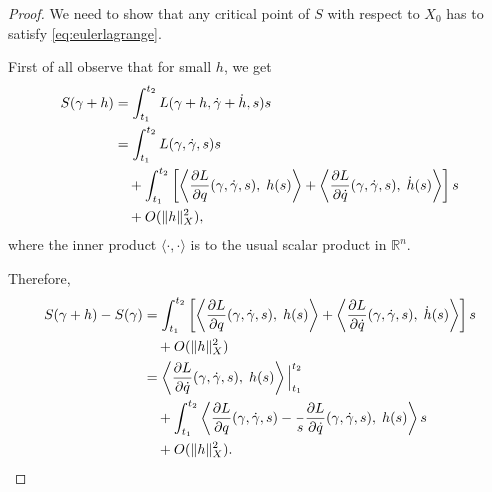 \documentclass[english,fontsize=11pt,paper=a5,oneside]{scrbook}
\newcommand{\R}{\mathbb{R}}
\newcommand{\lag}{\langle}
\newcommand{\rag}{\rangle}
\let\d\relax
\DeclareMathOperator{\d}{d}
\theoremstyle{definition}
\begin{document}
\begin{proof}
    We need to show that any critical point of $S$ with respect to $X_0$ has to satisfy \eqref{eq:eulerlagrange}.

    First of all observe that for small $h$, we get
    \begin{equation}
        \begin{split}
            S(\gamma + h) &= \int_{t_1}^{t_2} L(\gamma + h, \dot \gamma + \dot h, s) \d s \\
            &= \int_{t_1}^{t_2} %
                L(\gamma, \dot \gamma, s) \d s \\
            &\quad + \int_{t_1}^{t_2} \left[
                \left\lag
                    \frac{\partial L}{\partial q}(\gamma, \dot \gamma, s),\;
                    h(s)
                \right\rag
                + \left\lag
                    \frac{\partial L}{\partial \dot q}(\gamma, \dot \gamma, s),\;
                    \dot h(s)
                \right\rag
            \right] \d s \\
            &\quad + O(\|h\|^2_X),
        \end{split}
    \end{equation}
    where the inner product $\lag\cdot,\cdot\rag$ is to the usual scalar product in $\R^n$.

    Therefore,
    \begin{equation}
        \begin{split}
            S(\gamma+h) - S(\gamma) &= \int_{t_1}^{t_2} \left[
                \left\lag\frac{\partial L}{\partial q}(\gamma, \dot \gamma, s),\; h(s)\right\rag
                + \left\lag\frac{\partial L}{\partial \dot q}(\gamma, \dot \gamma, s),\; \dot h(s)\right\rag
            \right] \d s\\
            &\quad + O(\|h\|^2_X)\\
            &= \left\lag\frac{\partial L}{\partial \dot q}(\gamma, \dot \gamma, s),\; h(s)\right\rag \Big|_{t_1}^{t_2} \\
            &\quad + \int_{t_1}^{t_2} \left\lag
                \frac{\partial L}{\partial q}(\gamma, \dot \gamma, s)
                - \frac{\d}{\d s}\frac{\partial L}{\partial \dot q}(\gamma, \dot \gamma, s)
            ,\; h(s)\right\rag \d s\\
            &\quad + O(\|h\|^2_X).
        \end{split}
    \end{equation}


\end{proof}
\end{document}
